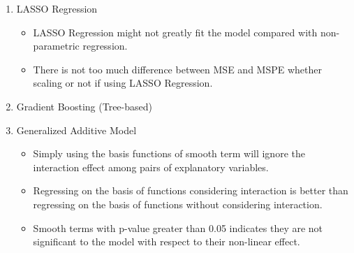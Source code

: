 \documentclass[11pt]{article}
\begin{document}
\begin{enumerate}
\item LASSO Regression
\begin{itemize}
\item LASSO Regression might not greatly fit the model compared with non-parametric regression.
\item There is not too much difference  between MSE and MSPE whether scaling or not if using LASSO Regression.
\end{itemize}
\item Gradient Boosting (Tree-based)
\item Generalized Additive Model
\begin{itemize}
\item Simply using the basis functions of smooth term will ignore the interaction effect among pairs of explanatory variables.
\item Regressing on the basis of functions considering interaction is better than regressing on the basis of functions without considering interaction.
\item Smooth terms with p-value greater than 0.05 indicates they are not significant to the model with respect to their non-linear effect.
\end{itemize}
\end{enumerate}

\newpage
\end{document}
